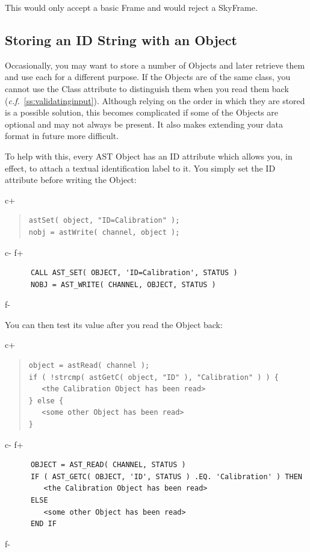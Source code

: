 \documentclass[twoside,11pt]{article}
\newcommand{\secref}[1]{\S\ref{#1}}
\renewcommand{\secref}[1]{\ref{#1}}
\begin{document}
This would only accept a basic Frame and would reject a SkyFrame.

\subsection{Storing an ID String with an Object}

Occasionally, you may want to store a number of Objects and later
retrieve them and use each for a different purpose. If the Objects are
of the same class, you cannot use the Class attribute to distinguish
them when you read them back
({\em{c.f.}}~\secref{ss:validatinginput}). Although relying on the
order in which they are stored is a possible solution, this becomes
complicated if some of the Objects are optional and may not always be
present. It also makes extending your data format in future more
difficult.

To help with this, every AST Object has an ID attribute which allows
you, in effect, to attach a textual identification label to it. You
simply set the ID attribute before writing the Object:

c+
\begin{quote}
\small
\begin{verbatim}
astSet( object, "ID=Calibration" );
nobj = astWrite( channel, object );
\end{verbatim}
\normalsize
\end{quote}
c-
f+
\small
\begin{verbatim}
      CALL AST_SET( OBJECT, 'ID=Calibration', STATUS )
      NOBJ = AST_WRITE( CHANNEL, OBJECT, STATUS )
\end{verbatim}
\normalsize
f-

You can then test its value after you read the Object back:

c+
\begin{quote}
\small
\begin{verbatim}
object = astRead( channel );
if ( !strcmp( astGetC( object, "ID" ), "Calibration" ) ) {
   <the Calibration Object has been read>
} else {
   <some other Object has been read>
}
\end{verbatim}
\normalsize
\end{quote}
c-
f+
\small
\begin{verbatim}
      OBJECT = AST_READ( CHANNEL, STATUS )
      IF ( AST_GETC( OBJECT, 'ID', STATUS ) .EQ. 'Calibration' ) THEN
         <the Calibration Object has been read>
      ELSE
         <some other Object has been read>
      END IF
\end{verbatim}
\normalsize
f-
\end{document}
